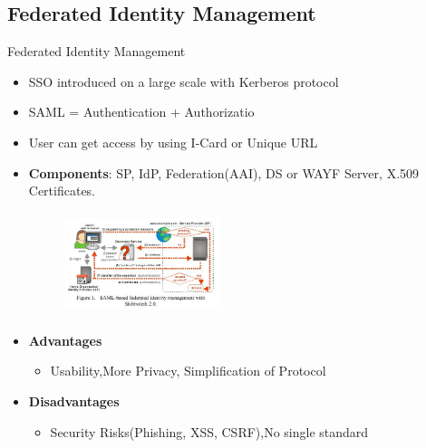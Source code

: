 \documentclass[xcolor=dvipsnames]{beamer}
\begin{document}
\subsection{Federated Identity Management}
\begin{frame}{Federated Identity Management}
\begin{itemize}
\item SSO introduced on a large scale with Kerberos protocol
\item SAML = Authentication + Authorizatio
\item User can get access by using I-Card or Unique URL
\item \textbf{Components}: SP, IdP, Federation(AAI), DS or WAYF Server, X.509 Certificates.
\begin{figure}
\includegraphics[width=4.5cm,height=3cm]{fidm}
\end{figure}
\item \textbf{Advantages}
\begin{itemize}
	\item Usability,More Privacy, Simplification of Protocol
\end{itemize}
\item \textbf{Disadvantages}
\begin{itemize}
	\item Security Risks(Phishing, XSS, CSRF),No single standard 
\end{itemize}
\end{itemize}
\end{frame}
\end{document}
